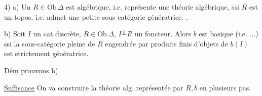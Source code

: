 4) \uline{} a) Un $R\in\mathrm{Ob}\,\Delta$ est algébrique, i.e. représente une théorie algébrique, ssi $R$ est un topos, i.e. admet une petite sous-catégorie génératrice. .

b) Soit $I$ un cat discrète, $R\in\mathrm{Ob}\,\Delta$, $I\overset b{-} R$ un foncteur. Alors \unsure{$*$} $b$ est basique (i.e. ...)  ssi la sous-catégorie pleine de $R$ engendrée par produits finis d'objets de $b(I)$ est strictement génératrice.

\uline{Dém}   prouvons  b).

\uline{Suffisance} On va construire la théorie alg.  représentée par $R,b$ en plusieurs pas.

